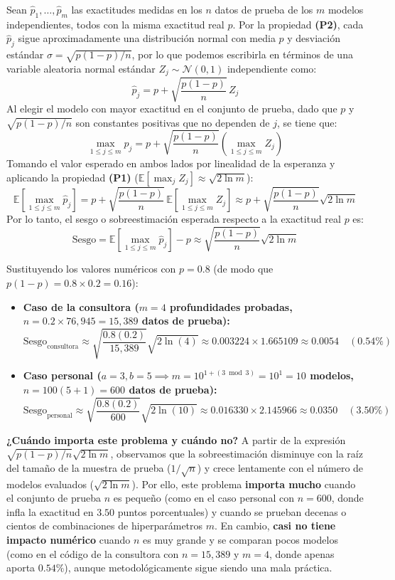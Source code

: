 \documentclass[11pt, letterpaper]{article}
\begin{document}
Sean $\hat{p}_1, \dots, \hat{p}_m$ las exactitudes medidas en los $n$ datos de prueba de los $m$ modelos independientes, todos con la misma exactitud real $p$. Por la propiedad \textbf{(P2)}, cada $\hat{p}_j$ sigue aproximadamente una distribución normal con media $p$ y desviación estándar $\sigma = \sqrt{p(1-p)/n}$, por lo que podemos escribirla en términos de una variable aleatoria normal estándar $Z_j \sim \mathcal{N}(0,1)$ independiente como:
\[
    \hat{p}_j = p + \sqrt{\frac{p(1 - p)}{n}}\, Z_j
\]
Al elegir el modelo con mayor exactitud en el conjunto de prueba, dado que $p$ y $\sqrt{p(1-p)/n}$ son constantes positivas que no dependen de $j$, se tiene que:
\[
    \max_{1 \le j \le m} \hat{p}_j = p + \sqrt{\frac{p(1 - p)}{n}} \left(\max_{1 \le j \le m} Z_j\right)
\]
Tomando el valor esperado en ambos lados por linealidad de la esperanza y aplicando la propiedad \textbf{(P1)} ($\mathbb{E}[\max_j Z_j] \approx \sqrt{2 \ln m}$):
\[
    \mathbb{E}\left[\max_{1 \le j \le m} \hat{p}_j\right] = p + \sqrt{\frac{p(1 - p)}{n}}\, \mathbb{E}\left[\max_{1 \le j \le m} Z_j\right] \approx p + \sqrt{\frac{p(1 - p)}{n}}\sqrt{2 \ln m}
\]
Por lo tanto, el sesgo o sobreestimación esperada respecto a la exactitud real $p$ es:
\[
    \text{Sesgo} = \mathbb{E}\left[\max_{1 \le j \le m} \hat{p}_j\right] - p \approx \sqrt{\frac{p(1 - p)}{n}}\sqrt{2 \ln m}
\]

Sustituyendo los valores numéricos con $p = 0.8$ (de modo que $p(1-p) = 0.8 \times 0.2 = 0.16$):
\begin{itemize}
    \item \textbf{Caso de la consultora ($m = 4$ profundidades probadas, $n = 0.2 \times 76{,}945 = 15{,}389$ datos de prueba):}
    \[
        \text{Sesgo}_{\text{consultora}} \approx \sqrt{\frac{0.8(0.2)}{15{,}389}}\sqrt{2 \ln(4)} \approx 0.003224 \times 1.665109 \approx 0.0054 \quad (0.54\%)
    \]
    \item \textbf{Caso personal ($a = 3, b = 5 \implies m = 10^{1 + (3 \bmod 3)} = 10^1 = 10$ modelos, $n = 100(5 + 1) = 600$ datos de prueba):}
    \[
        \text{Sesgo}_{\text{personal}} \approx \sqrt{\frac{0.8(0.2)}{600}}\sqrt{2 \ln(10)} \approx 0.016330 \times 2.145966 \approx 0.0350 \quad (3.50\%)
    \]
\end{itemize}

\textbf{¿Cuándo importa este problema y cuándo no?} A partir de la expresión $\sqrt{p(1-p)/n}\sqrt{2\ln m}$, observamos que la sobreestimación disminuye con la raíz del tamaño de la muestra de prueba ($1/\sqrt{n}$) y crece lentamente con el número de modelos evaluados ($\sqrt{2\ln m}$). Por ello, este problema \textbf{importa mucho} cuando el conjunto de prueba $n$ es pequeño (como en el caso personal con $n=600$, donde infla la exactitud en $3.50$ puntos porcentuales) y cuando se prueban decenas o cientos de combinaciones de hiperparámetros $m$. En cambio, \textbf{casi no tiene impacto numérico} cuando $n$ es muy grande y se comparan pocos modelos (como en el código de la consultora con $n=15{,}389$ y $m=4$, donde apenas aporta $0.54\%$), aunque metodológicamente sigue siendo una mala práctica.
\end{document}
